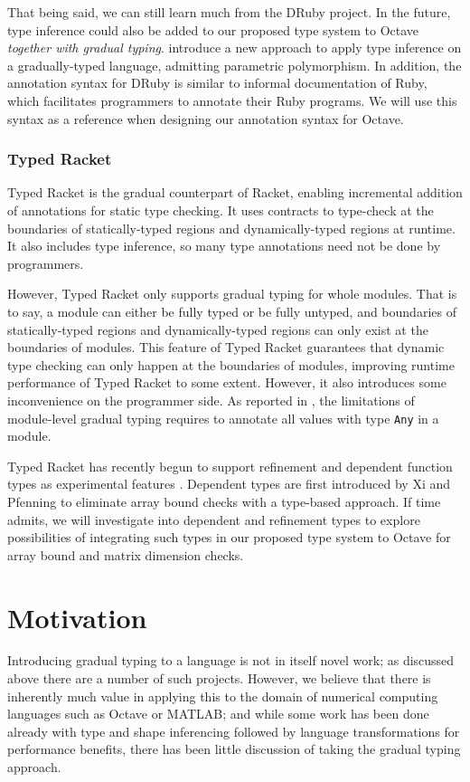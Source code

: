 That being said, we can still learn much from the DRuby project. In the future, type inference could also be added to our proposed type system to Octave \emph{together with gradual typing}. \citet{garcia2015principal} introduce a new approach to apply type inference on a gradually-typed language, admitting parametric polymorphism. In addition, the annotation syntax for DRuby is similar to informal documentation of Ruby, which facilitates programmers to annotate their Ruby programs. We will use this syntax as a reference when designing our annotation syntax for Octave.

\subsubsection{Typed Racket \cite{tobin2006interlanguage}}
Typed Racket is the gradual counterpart of Racket, enabling incremental addition of annotations for static type checking. It uses contracts to type-check at the boundaries of statically-typed regions and dynamically-typed regions at runtime. It also includes type inference, so many type annotations need not be done by programmers.

However, Typed Racket only supports gradual typing for whole modules. That is to say, a module can either be fully typed or be fully untyped, and boundaries of statically-typed regions and dynamically-typed regions can only exist at the boundaries of modules. This feature of Typed Racket guarantees that dynamic type checking can only happen at the boundaries of modules, improving runtime performance of Typed Racket to some extent. However, it also introduces some inconvenience on the programmer side. As reported in \cite{figueroa2012practical}, the limitations of module-level gradual typing requires to annotate all values with type {\tt Any} in a module.

Typed Racket has recently begun to support refinement and dependent function types as experimental features \cite{kent2017refinement}. Dependent types are first introduced by Xi and Pfenning \cite{xi1998eliminating} to eliminate array bound checks with a type-based approach. If time admits, we will investigate into dependent and refinement types to explore possibilities of integrating such types in our proposed type system to Octave for array bound and matrix dimension checks.


\section{Motivation}
Introducing gradual typing to a language is not in itself novel work; as discussed above there are a number of such projects. However, we believe that there is inherently much value in applying this to the domain of numerical computing languages such as Octave or MATLAB; and while some work has been done already with type and shape inferencing followed by language transformations for performance benefits, there has been little discussion of taking the gradual typing approach.

